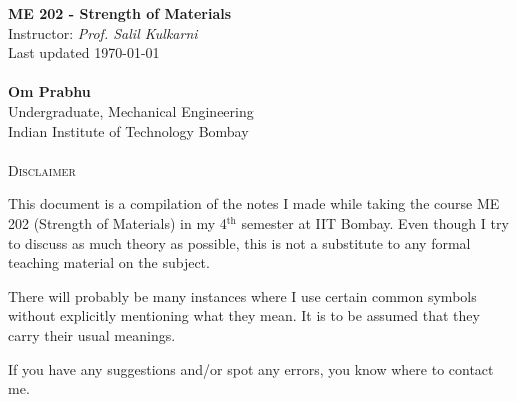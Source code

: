 \documentclass[11pt]{article}
\theoremstyle{definition}
\begin{document}
\begin{center}
{\LARGE \bf ME 202 - Strength of Materials}\\
{Instructor: \textit{Prof. Salil Kulkarni}}\\
Last updated \today \\~\\
{\large \bf Om Prabhu}\\
Undergraduate, Mechanical Engineering\\
Indian Institute of Technology Bombay\\~\\
\textsc{Disclaimer}
\end{center}
\vspace{-6pt}

This document is a compilation of the notes I made while taking the course ME 202 (Strength of Materials) in my 4$^{\text{th}}$ semester at IIT Bombay. Even though I try to discuss as much theory as possible, this is not a substitute to any formal teaching material on the subject.

There will probably be many instances where I use certain common symbols without explicitly mentioning what they mean. It is to be assumed that they carry their usual meanings.

If you have any suggestions and/or spot any errors, you know where to contact me.

\hrulefill
\tableofcontents
\hrulefill
\pagebreak
\end{document}
